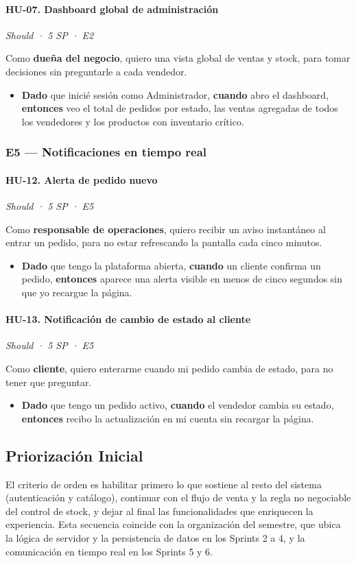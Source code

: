 \documentclass[12pt, a4paper]{article}
\newcommand{\hutag}[3]{\textit{#1 · #2 · #3}\par\vspace{2pt}}
\begin{document}
\paragraph{HU-07. Dashboard global de administración}
\hutag{Should}{5 SP}{E2}
Como \textbf{dueña del negocio}, quiero una vista global de ventas y stock, para tomar decisiones sin preguntarle a cada vendedor.
\begin{itemize}[leftmargin=*]
    \item \textbf{Dado} que inicié sesión como Administrador, \textbf{cuando} abro el dashboard, \textbf{entonces} veo el total de pedidos por estado, las ventas agregadas de todos los vendedores y los productos con inventario crítico.
\end{itemize}

\subsubsection{E5 --- Notificaciones en tiempo real}

\paragraph{HU-12. Alerta de pedido nuevo}
\hutag{Should}{5 SP}{E5}
Como \textbf{responsable de operaciones}, quiero recibir un aviso instantáneo al entrar un pedido, para no estar refrescando la pantalla cada cinco minutos.
\begin{itemize}[leftmargin=*]
    \item \textbf{Dado} que tengo la plataforma abierta, \textbf{cuando} un cliente confirma un pedido, \textbf{entonces} aparece una alerta visible en menos de cinco segundos sin que yo recargue la página.
\end{itemize}

\paragraph{HU-13. Notificación de cambio de estado al cliente}
\hutag{Should}{5 SP}{E5}
Como \textbf{cliente}, quiero enterarme cuando mi pedido cambia de estado, para no tener que preguntar.
\begin{itemize}[leftmargin=*]
    \item \textbf{Dado} que tengo un pedido activo, \textbf{cuando} el vendedor cambia su estado, \textbf{entonces} recibo la actualización en mi cuenta sin recargar la página.
\end{itemize}

\subsection{Priorización Inicial}
El criterio de orden es habilitar primero lo que sostiene al resto del sistema (autenticación y catálogo), continuar con el flujo de venta y la regla no negociable del control de stock, y dejar al final las funcionalidades que enriquecen la experiencia. Esta secuencia coincide con la organización del semestre, que ubica la lógica de servidor y la persistencia de datos en los Sprints 2 a 4, y la comunicación en tiempo real en los Sprints 5 y 6.
\end{document}
